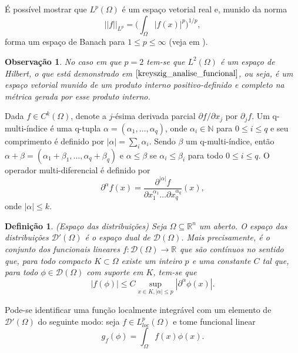 \documentclass[12pt]{book}
\newtheorem{definicao}[teorema]{Definição}
\newtheorem{observacao}[teorema]{Observação}
\newcommand{\derivadaparcialabrev}[1]{\partial_{#1}}
\newcommand{\distribuicoes}{\distribuicoesgeral{\Omega}}
\newcommand{\distribuicoesgeral}[1]{\mathcal{D'}(#1)}
\newcommand{\espacoLdois}[1]{L^{2}(#1)}
\newcommand{\espacoLpcomp}[1]{L^{p}_{loc}(#1)}
\newcommand{\espacoLpGeral}[2]{L^{#1}(#2)}
\newcommand{\funcoesdiferenciaveis}[2]{C^{#1}(#2)}
\newcommand{\funcoesteste}{\funcoestestegeral{\Omega}}
\newcommand{\funcoestestegeral}[1]{\mathcal{D}(#1)}
\newcommand{\normaLp}[1]{||#1||_{L^{p}}}
\newcommand{\normaLpdefinicao}[2]{ \Big(\int_{#2}#1^{p}\Big)^{1/p}}
\newcommand{\real}[1]{\mathbb{R}^{#1}}
\newcommand{\reta}{\real{}}
\begin{document}
	
	É possível mostrar que $\espacoLpGeral{p}{\Omega}$ é um espaço vetorial real e, munido da norma
	$$
	\normaLp{f}=\normaLpdefinicao{|f(x)|}{\Omega},
	$$
	forma um espaço de Banach para $1\leq p\leq \infty$ (veja em \cite{breazis_sobolev_spaces}). 
	
	\begin{observacao}
		No caso em que $p=2$ tem-se que $\espacoLdois{\Omega}$ é um espaço de Hilbert, o que está demonstrado em $\cite{kreyszig_analise_funcional}$, ou seja, é um espaço vetorial munido de um produto interno positivo-definido e completo na métrica gerada por esse produto interno.
	\end{observacao}
	
	Dada $f \in \funcoesdiferenciaveis{k}{\Omega}$, denote a $j$-ésima derivada parcial $\partial f/\partial x_{j}$ por $\derivadaparcialabrev{j}f $. Um q-multi-índice é uma q-tupla $\alpha = (\alpha_{1}, \dots, \alpha_{q})$, onde $\alpha_{i} \in \mathbb{N}$ para $0\leq i \leq q$ e seu comprimento é definido por $|\alpha| = \sum_{i}\alpha_{i}$. Sendo $\beta$ um q-multi-índice, então $\alpha+\beta=(\alpha_{1}+\beta_{1}, \dots, \alpha_{q}+\beta_{q})$ e $\alpha\leq \beta$ se $\alpha_{i}\leq\beta_{i}$ para todo $0\leq i \leq q$. O operador multi-diferencial é definido por 
	$$
	\partial^{\alpha} f(x) = \frac{\partial^{|\alpha|} f}{ \partial{x^{\alpha_{1}}_{1}} \dots \partial{x^{\alpha_{q}}_{q}} }(x),
	$$
	onde $|\alpha|\leq k$.
	
	\begin{definicao}
		(Espaço das distribuições) Seja $\Omega \subseteq \real{n}$ um aberto. O espaço das distribuições $\distribuicoesgeral{\Omega}$ é o espaço dual de $\funcoesteste$. Mais precisamente, é o conjunto dos funcionais lineares $f:\funcoesteste \to \reta$ que são contínuos no sentido que, 	para todo compacto $K\subset \Omega$ existe um inteiro $p$ e uma constante $C$ tal que, para todo $\phi\in \funcoesteste$ com suporte em $K$, tem-se que
		$$
		|f(\phi)| \leq C \sup\limits_{x\in K, |\alpha|\leq p}|\partial^{\alpha}\phi(x)|.
		$$
	\end{definicao}
	
	Pode-se identificar uma função localmente integrável com um elemento de $\distribuicoes$ do seguinte modo: seja $f \in \espacoLpcomp{\Omega}$ e tome funcional linear
	$$
	g_{f}(\phi)=\int_{\Omega}f(x)\phi(x).
	$$
	
\end{document}
